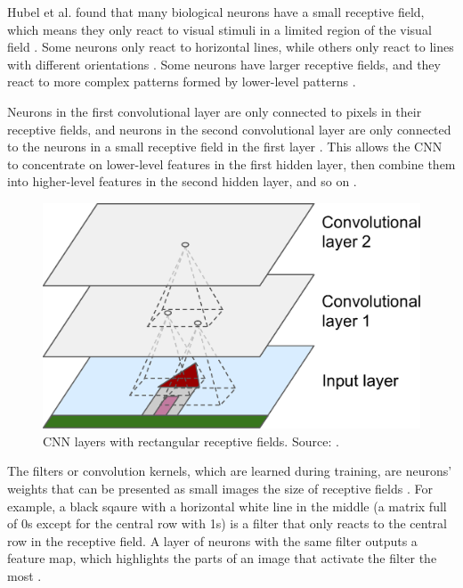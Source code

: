 \documentclass[a4paper,11pt,oneside]{article}
\begin{document}
  Hubel et al. \cite{hubel1959single, hubel1959receptive, hubel1968receptive} found that many biological neurons have
  a small receptive field, which  means they only react to visual stimuli in a limited region of the visual field
  \cite{geron2019hands}. Some neurons only react to horizontal lines, while others only react to lines with
  different orientations \cite{geron2019hands}. Some neurons have larger receptive fields, and they react to more complex
  patterns formed by lower-level patterns \cite{geron2019hands}.

  Neurons in the first convolutional layer are only connected to pixels in their receptive fields, and neurons in the
  second convolutional layer are only connected to the neurons in a small receptive field in the first layer
  \cite{geron2019hands}. This allows the CNN to concentrate on lower-level features in the first hidden layer, then
  combine them into higher-level features in the second hidden layer, and so on \cite{geron2019hands}.

  \begin{figure}[ht]
    \begin{center}
      \includegraphics[width=.8\textwidth]{cnn_layers.png}
    \end{center}
    \caption{CNN layers with rectangular receptive fields. Source: \cite{geron2019hands}.}
  \end{figure}

  The filters or convolution kernels, which are learned during training, are neurons' weights that can be presented as
  small images the size of receptive fields \cite{geron2019hands}. For example, a black sqaure with a horizontal white
  line in the middle (a matrix full of 0s except for the central row with 1s) is a filter that only reacts to the central
  row in the receptive field. A layer of neurons with the same filter outputs a feature map, which highlights the parts
  of an image that activate the filter the most \cite{geron2019hands}.
\end{document}
